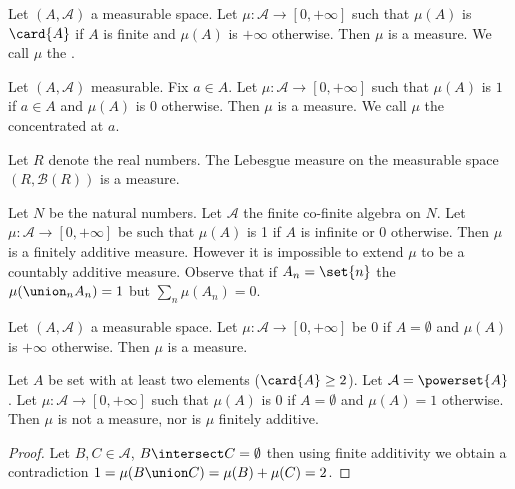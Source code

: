 
\begin{expl}
Let $(A, \mathcal{A})$ a measurable space.
Let $\mu: \mathcal{A} \to [0, +\infty]$ such that
$\mu(A)$ is $\card{A}$ if $A$ is finite
and $\mu(A)$ is $+\infty$ otherwise.
Then $\mu$ is a measure.
We call $\mu$ the
.
\end{expl}

\begin{expl}
Let $(A, \mathcal{A})$ measurable.
Fix $a \in A$.
Let $\mu: \mathcal{A} \to [0, +\infty]$ such
that $\mu(A)$ is $1$ if $a \in A$ and
$\mu(A)$ is $0$ otherwise.
Then $\mu$ is a measure.
We call $\mu$ the
concentrated at $a$.
\end{expl}

\begin{expl}
Let $R$ denote the real numbers.
The Lebesgue measure on the measurable
space $(R, \mathcal{B}(R))$ is a measure.
\end{expl}

\begin{expl}
Let $N$ be the natural numbers.
Let $\mathcal{A}$ the finite
co-finite algebra on $N$.
Let $\mu: \mathcal{A} \to [0, +\infty]$
be such that $\mu(A)$ is 1 if
$A$ is infinite or 0 otherwise.
Then $\mu$ is a finitely additive measure.
However it is impossible to extend
$\mu$ to be a countably additive measure.
Observe that if $A_n = \set{n}$ the
$\mu(\union_{n} A_n) = 1$ but
$\sum_{n} \mu(A_n) = 0$.
\end{expl}

\begin{expl}
Let $(A, \mathcal{A})$ a measurable
space.
Let $\mu: \mathcal{A} \to [0, +\infty]$
be $0$ if $A = \emptyset$ and
$\mu(A)$ is $+\infty$ otherwise.
Then $\mu$ is a measure.
\end{expl}

\begin{expl}
Let $A$ be set with at least
two elements ($\card{A} \geq 2$).
Let $\mathcal{A} = \powerset{A}$.
Let $\mu: \mathcal{A} \to [0, +\infty]$
such that $\mu(A)$ is $0$ if $A = \emptyset$
and $\mu(A) = 1$ otherwise.
Then $\mu$ is not a measure,
nor is $\mu$ finitely additive.
\begin{proof}
Let $B, C \in \mathcal{A}$,
$B \intersect C = \emptyset$
then using finite additivity
we obtain a contradiction
$
1 = \mu(B \union C) = \mu(B) + \mu(C) = 2
$.
\end{proof}
\end{expl}


\strats
